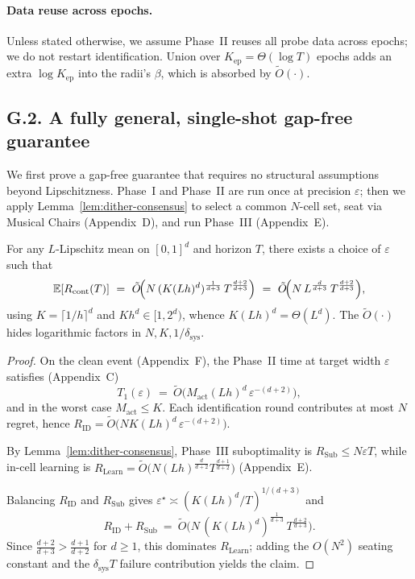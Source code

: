 \paragraph{Data reuse across epochs.}
Unless stated otherwise, we assume Phase~II reuses all probe data across epochs; we do not restart identification. Union over $K_{\text{ep}}=\Theta(\log T)$ epochs adds an extra $\log K_{\text{ep}}$ into the radii’s $\beta$, which is absorbed by $\tilde O(\cdot)$.

\subsection*{G.2.\; A fully general, single-shot gap-free guarantee}
\label{subsec:single-shot}

We first prove a gap-free guarantee that requires  {no} structural assumptions beyond Lipschitzness. Phase~I and Phase~II are run once at precision $\varepsilon$; then we apply Lemma~\ref{lem:dither-consensus} to select a common $N$-cell set, seat via Musical Chairs (Appendix~D), and run Phase~III (Appendix~E).

\begin{proposition}
\label{prop:gap-free-single-shot}
For any $L$-Lipschitz mean on $[0,1]^d$ and horizon $T$, there exists a choice of $\varepsilon$ such that
\[
\EE[R_{\cont}(T)]\ =\ \tilde O\!\Big(N\, (K(Lh)^d)^{\frac{1}{d+3}}\, T^{\frac{d+2}{d+3}}\Big)\ =\ \tilde O\!\Big(N\, L^{\frac{d}{d+3}}\, T^{\frac{d+2}{d+3}}\Big),
\]
using $K=\lceil 1/h\rceil^d$ and $K h^d\in[1,2^d)$, whence $K(Lh)^d=\Theta(L^d)$. The $\tilde O(\cdot)$ hides logarithmic factors in $N,K,1/\delta_{\text{sys}}$.
\end{proposition}

\begin{proof}
On the clean event (Appendix~F), the Phase~II time at target width $\varepsilon$ satisfies (Appendix~C)
\[
T_1(\varepsilon)\ =\ \tilde O\!\big(M_{\mathrm{act}}(Lh)^d\,\varepsilon^{-(d+2)}\big),
\]
and in the worst case $M_{\mathrm{act}}\le K$. Each identification round contributes at most $N$ regret, hence
$R_{\mathrm{ID}}=\tilde O\!\big(NK(Lh)^d\,\varepsilon^{-(d+2)}\big)$. 

By Lemma~\ref{lem:dither-consensus}, Phase~III suboptimality is $R_{\mathrm{Sub}}\le N\varepsilon T$, while in-cell learning is $R_{\mathrm{Learn}}=\tilde O\!\big(N (Lh)^{\frac{d}{d+2}} T^{\frac{d+1}{d+2}}\big)$ (Appendix~E). 

Balancing $R_{\mathrm{ID}}$ and $R_{\mathrm{Sub}}$ gives $\varepsilon^\star\asymp (K(Lh)^d/T)^{1/(d+3)}$ and
\[
R_{\mathrm{ID}}+R_{\mathrm{Sub}}\ =\ \tilde O\!\Big(N\, (K(Lh)^d)^{\frac{1}{d+3}}\, T^{\frac{d+2}{d+3}}\Big).
\]
Since $\frac{d+2}{d+3}>\frac{d+1}{d+2}$ for $d\ge 1$, this dominates $R_{\mathrm{Learn}}$; adding the $O(N^2)$ seating constant and the $\delta_{\text{sys}}T$ failure contribution yields the claim.
\end{proof}

